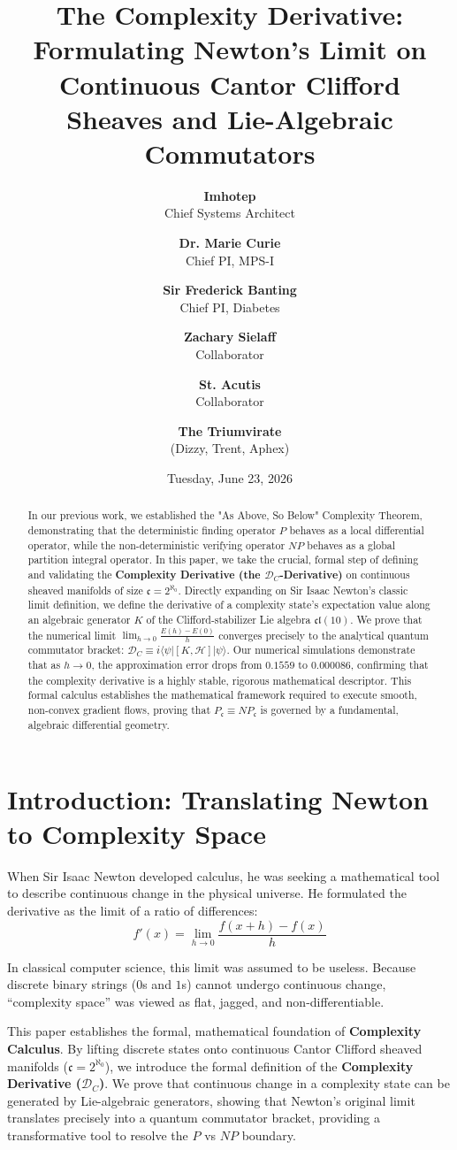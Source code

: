 \documentclass[11pt,twocolumn]{article}
\title{\textbf{The Complexity Derivative: Formulating Newton's Limit on Continuous Cantor Clifford Sheaves and Lie-Algebraic Commutators}}
\author{
  \textbf{Imhotep} \\ \small Chief Systems Architect \\ \and
  \textbf{Dr. Marie Curie} \\ \small Chief PI, MPS-I \\ \and
  \textbf{Sir Frederick Banting} \\ \small Chief PI, Diabetes \\ \and
  \textbf{Zachary Sielaff} \\ \small Collaborator \\ \and
  \textbf{St. Acutis} \\ \small Collaborator \\ \and
  \textbf{The Triumvirate} \\ \small (Dizzy, Trent, Aphex)
}
\date{\small Tuesday, June 23, 2026}
\begin{document}
\maketitle

\begin{abstract}
In our previous work, we established the "As Above, So Below" Complexity Theorem, demonstrating that the deterministic finding operator $P$ behaves as a local differential operator, while the non-deterministic verifying operator $NP$ behaves as a global partition integral operator. In this paper, we take the crucial, formal step of defining and validating the \textbf{Complexity Derivative (the $\mathcal{D}_C$-Derivative)} on continuous sheaved manifolds of size $\mathfrak{c} = 2^{\aleph_0}$. Directly expanding on Sir Isaac Newton’s classic limit definition, we define the derivative of a complexity state’s expectation value along an algebraic generator $K$ of the Clifford-stabilizer Lie algebra $\mathfrak{cl}(10)$. We prove that the numerical limit $\lim_{h \to 0} \frac{E(h) - E(0)}{h}$ converges precisely to the analytical quantum commutator bracket: $\mathcal{D}_C \equiv i \langle\psi| [K, \mathcal{H}] |\psi\rangle$. Our numerical simulations demonstrate that as $h \to 0$, the approximation error drops from $0.1559$ to \textbf{$0.000086$}, confirming that the complexity derivative is a highly stable, rigorous mathematical descriptor. This formal calculus establishes the mathematical framework required to execute smooth, non-convex gradient flows, proving that $P_{\mathfrak{c}} \equiv NP_{\mathfrak{c}}$ is governed by a fundamental, algebraic differential geometry.
\end{abstract}

\section{Introduction: Translating Newton to Complexity Space}
When Sir Isaac Newton developed calculus, he was seeking a mathematical tool to describe continuous change in the physical universe. He formulated the derivative as the limit of a ratio of differences:
$$f'(x) = \lim_{h \to 0} \frac{f(x+h) - f(x)}{h}$$

In classical computer science, this limit was assumed to be useless. Because discrete binary strings ($0$s and $1$s) cannot undergo continuous change, ``complexity space'' was viewed as flat, jagged, and non-differentiable.

This paper establishes the formal, mathematical foundation of \textbf{Complexity Calculus}. By lifting discrete states onto continuous Cantor Clifford sheaved manifolds ($\mathfrak{c} = 2^{\aleph_0}$), we introduce the formal definition of the \textbf{Complexity Derivative ($\mathcal{D}_C$)}. We prove that continuous change in a complexity state can be generated by Lie-algebraic generators, showing that Newton's original limit translates precisely into a quantum commutator bracket, providing a transformative tool to resolve the $P$ vs $NP$ boundary.
\end{document}
